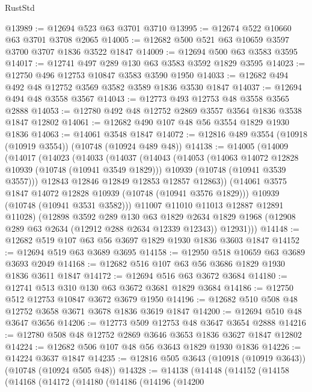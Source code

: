 \begin{lexlean}{RustStd}
\begin{coremodule}
{\begin{coremodule}
{{{{{@13989 := @12694 @523 @63 @3701 @3710
@13995 := @12674 @522 @10660 @63 @3701 @3708 @2065
@14005 := @12682 @500 @521 @63 @10659 @3597 @3700 @3707 @1836 @3522 @1847
@14009 := @12694 @500 @63 @3583 @3595
@14017 := @12741 @497 @289 @130 @63 @3583 @3592 @1829 @3595
@14023 := @12750 @496 @12753 @10847 @3583 @3590 @1950
@14033 := @12682 @494 @492 @48 @12752 @3569 @3582 @3589 @1836 @3530 @1847
@14037 := @12694 @494 @48 @3558 @3567
@14043 := @12773 @493 @12753 @48 @3558 @3565 @2888
@14053 := @12780 @492 @48 @12752 @2869 @3557 @3564 @1836 @3538 @1847 @12802
@14061 := @12682 @490 @107 @48 @56 @3554 @1829 @1930 @1836
@14063 := @14061 @3548 @1847
@14072 := @12816 @489 @3554 (@10918 (@10919 @3554)) (@10748 (@10924 @489 @48))
@14138 := @14005
    (@14009
      (@14017
        (@14023
          (@14033
            (@14037
              (@14043
                (@14053
                  (@14063 @14072 @12828 @10939 (@10748 (@10941 @3549 @1829)))
                  @10939
                  (@10748 (@10941 @3539 @3557)))
                @12843
                @12846
                @12849
                @12853
                @12857
                @12863))
            (@14061 @3575 @1847 @14072 @12828 @10939 (@10748 (@10941 @3576 @1829)))
            @10939
            (@10748 (@10941 @3531 @3582)))
          @11007
          @11010
          @11013
          @12887
          @12891
          @11028)
        (@12898
          @3592
          @289
          @130
          @63
          @1829
          @2634
          @1829
          @1968
          (@12908 @289 @63 @2634 (@12912 @288 @2634 @12339 @12343))
          @12931)))
@14148 := @12682 @519 @107 @63 @56 @3697 @1829 @1930 @1836 @3603 @1847
@14152 := @12694 @519 @63 @3689 @3695
@14158 := @12950 @518 @10659 @63 @3689 @3693 @2049
@14168 := @12682 @516 @107 @63 @56 @3686 @1829 @1930 @1836 @3611 @1847
@14172 := @12694 @516 @63 @3672 @3684
@14180 := @12741 @513 @310 @130 @63 @3672 @3681 @1829 @3684
@14186 := @12750 @512 @12753 @10847 @3672 @3679 @1950
@14196 := @12682 @510 @508 @48 @12752 @3658 @3671 @3678 @1836 @3619 @1847
@14200 := @12694 @510 @48 @3647 @3656
@14206 := @12773 @509 @12753 @48 @3647 @3654 @2888
@14216 := @12780 @508 @48 @12752 @2869 @3646 @3653 @1836 @3627 @1847 @12802
@14224 := @12682 @506 @107 @48 @56 @3643 @1829 @1930 @1836
@14226 := @14224 @3637 @1847
@14235 := @12816 @505 @3643 (@10918 (@10919 @3643)) (@10748 (@10924 @505 @48))
@14328 := @14138
    (@14148
      (@14152
        (@14158
          (@14168
            (@14172
              (@14180
                (@14186
                  (@14196
                    (@14200
}}}}}
\end{coremodule}}
\end{coremodule}
\end{lexlean}
